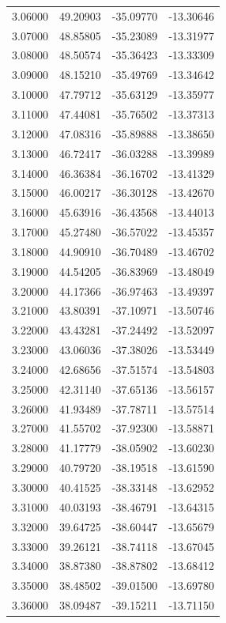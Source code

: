 \begin{table}
\begin{tabular}{llll}
3.06000 & 49.20903 & -35.09770 & -13.30646 \\
3.07000 & 48.85805 & -35.23089 & -13.31977 \\
3.08000 & 48.50574 & -35.36423 & -13.33309 \\
3.09000 & 48.15210 & -35.49769 & -13.34642 \\
3.10000 & 47.79712 & -35.63129 & -13.35977 \\
3.11000 & 47.44081 & -35.76502 & -13.37313 \\
3.12000 & 47.08316 & -35.89888 & -13.38650 \\
3.13000 & 46.72417 & -36.03288 & -13.39989 \\
3.14000 & 46.36384 & -36.16702 & -13.41329 \\
3.15000 & 46.00217 & -36.30128 & -13.42670 \\
3.16000 & 45.63916 & -36.43568 & -13.44013 \\
3.17000 & 45.27480 & -36.57022 & -13.45357 \\
3.18000 & 44.90910 & -36.70489 & -13.46702 \\
3.19000 & 44.54205 & -36.83969 & -13.48049 \\
3.20000 & 44.17366 & -36.97463 & -13.49397 \\
3.21000 & 43.80391 & -37.10971 & -13.50746 \\
3.22000 & 43.43281 & -37.24492 & -13.52097 \\
3.23000 & 43.06036 & -37.38026 & -13.53449 \\
3.24000 & 42.68656 & -37.51574 & -13.54803 \\
3.25000 & 42.31140 & -37.65136 & -13.56157 \\
3.26000 & 41.93489 & -37.78711 & -13.57514 \\
3.27000 & 41.55702 & -37.92300 & -13.58871 \\
3.28000 & 41.17779 & -38.05902 & -13.60230 \\
3.29000 & 40.79720 & -38.19518 & -13.61590 \\
3.30000 & 40.41525 & -38.33148 & -13.62952 \\
3.31000 & 40.03193 & -38.46791 & -13.64315 \\
3.32000 & 39.64725 & -38.60447 & -13.65679 \\
3.33000 & 39.26121 & -38.74118 & -13.67045 \\
3.34000 & 38.87380 & -38.87802 & -13.68412 \\
3.35000 & 38.48502 & -39.01500 & -13.69780 \\
3.36000 & 38.09487 & -39.15211 & -13.71150 \\

\end{tabular}
\end{table}
